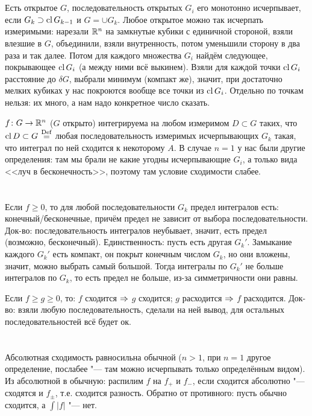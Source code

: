 \section{} %
Есть открытое $G$, последовательность открытых $G_i$ его монотонно исчерпывает, если $G_k \supset \operatorname{cl} G_{k-1}$ и $G=\cup G_k$.
Любое открытое можно так исчерпать измеримыми: нарезали $\mathbb{R}^n$ на замкнутые кубики с единичной стороной, взяли влезшие в $G$, объединили, взяли внутренность,
потом уменьшили сторону в два раза и так далее.
Потом для каждого множества $G_i$ найдём следующее, покрывающее $\operatorname{cl} G_i$ (а между ними всё выкинем).
Взяли для каждой точки $\operatorname{cl} G_i$ расстояние до $\delta G$, выбрали минимум (компакт же), значит, при достаточно мелких кубиках у нас покроются вообще все точки из $\operatorname{cl} G_i$.
Отдельно по точкам нельзя: их много, а нам надо конкретное число сказать.

$f \colon G \to \mathbb{R}^n$ ($G$ открыто) интегрируема на любом измеримом $D \subset G$ таких, что $\operatorname{cl} D \subset G$ $\stackrel{\mathrm{Def}}{=}$
любая последовательность измеримых исчерпывающих $G_k$ такая, что интеграл по ней сходится к некоторому $A$.
В случае $n=1$ у нас были другие определения: там мы брали не какие угодны исчерпывающие $G_i$, а только вида <<луч в бесконечность>>,
поэтому там условие сходимости слабее.

\pagebreak
\section{} %
Если $f \ge 0$, то для любой последовательности $G_k$ предел интегралов есть: конечный/бесконечные, причём предел не зависит от выбора последовательности.
Док-во: последовательность интегралов неубывает, значит, есть предел (возможно, бесконечный).
Единственность: пусть есть другая $G_k'$.
Замыкание каждого $G_k'$ есть компакт, он покрыт конечным числом $G_k$, но они вложены, значит, можно выбрать самый большой.
Тогда интегралы по $G_k'$ не больше интегралов по $G_k$, то есть предел не больше, из-за симметричности они равны.

Если $f \ge g \ge 0$, то: $f$ сходится $\Rightarrow$ $g$ сходится; $g$ расходится $\Rightarrow$ $f$ расходится.
Док-во: взяли любую последовательность, сделали на ней вывод, для остальных последовательностей всё будет ок.

\section{} %
Абсолютная сходимость равносильна обычной ($n>1$, при $n=1$ другое определение, послабее "--- там можно исчерпывать только определённым видом).
Из абсолютной в обычную: распилим $f$ на $f_+$ и $f_-$, если сходится абсолютно "--- сходятся и $f_\pm$, т.е. сходится разность.
Обратно от противного: пусть обычно сходится, а $\int |f|$ "--- нет.
\TODO %
